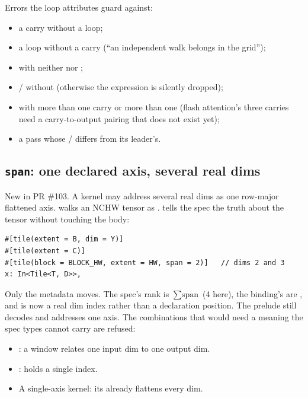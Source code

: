 Errors the loop attributes guard against:
\begin{itemize}
\item a carry without a loop;
\item a loop without a carry (``an independent walk belongs in the grid'');
\item {} with neither  nor ;
\item {}/ without  (otherwise the expression is silently dropped);
\item {} with more than one carry or more than one  (flash attention's three carries need a carry-to-output pairing that does not exist yet);
\item a  pass whose / differs from its leader's.
\end{itemize}

\subsection{\texttt{span}: one declared axis, several real dims}
\label{sec:span}

New in PR \#103. A kernel may address several real dims as one row-major
flattened axis.  walks an NCHW tensor
as \code{[B, C, HW]}.  tells the spec the truth about the tensor
without touching the body:

\begin{lstlisting}
#[tile(extent = B, dim = Y)]
#[tile(extent = C)]
#[tile(block = BLOCK_HW, extent = HW, span = 2)]   // dims 2 and 3
x: In<Tile<T, D>>,
\end{lstlisting}

Only the metadata moves. The spec's rank is $\sum \text{span}$ (4 here), the
binding's  are \code{[2, 3]}, and  is now a real dim
index rather than a declaration position. The prelude still decodes and addresses
one  axis. The combinations that would need a meaning the spec types cannot
carry are refused:
\begin{itemize}
\item {}: a window relates one input dim to one output dim.
\item {}:  holds a single index.
\item A single-axis kernel: its  already flattens every dim.
\end{itemize}
